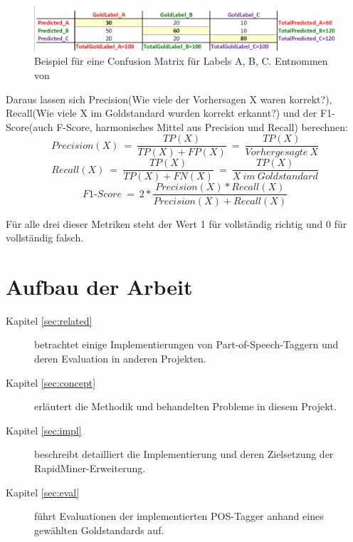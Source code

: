 \begin{figure}[htb]
	\includegraphics[width=\textwidth]{gfx/multi-class-confusionmatrix.png}
	\caption{Beispiel für eine Confusion Matrix für Labels A, B, C. Entnommen von \cite{Web:rxnlp}}
	\label{fig:intro:pos:metrics:confusion}
\end{figure}

Daraus lassen sich Precision(Wie viele der Vorhersagen X waren korrekt?), Recall(Wie viele X im Goldstandard wurden korrekt erkannt?) und der F1-Score(auch F-Score, harmonisches Mittel aus Precision und Recall) berechnen:
\[ Precision(X) \: = \: \frac{TP(X)}{TP(X)+FP(X)}\: = \: \frac{TP(X)}{Vorhergesagte\:X} \]
\[ Recall(X) \: = \: \frac{TP(X)}{TP(X)+FN(X)} \: = \: \frac{TP(X)}{X\:im\:Goldstandard} \]
\[ F1\mbox{-}Score \: = \: 2*\frac{Precision(X)*Recall(X)}{Precision(X)+Recall(X)} \]

Für alle drei dieser Metriken steht der Wert 1 für vollständig richtig und 0 für vollständig falsch.


\section{Aufbau der Arbeit}
\label{sec:intro:structure}

\begin{description}

\item[Kapitel \ref{sec:related}] betrachtet einige Implementierungen von Part-of-Speech-Taggern und deren Evaluation in anderen Projekten.
\item[Kapitel \ref{sec:concept}] erläutert die Methodik und behandelten Probleme in diesem Projekt.
\item[Kapitel \ref{sec:impl}] beschreibt detailliert die Implementierung und deren Zielsetzung der RapidMiner-Erweiterung.
\item[Kapitel \ref{sec:eval}] führt Evaluationen der implementierten POS-Tagger anhand eines gewählten Goldstandards auf.

\end{description}


